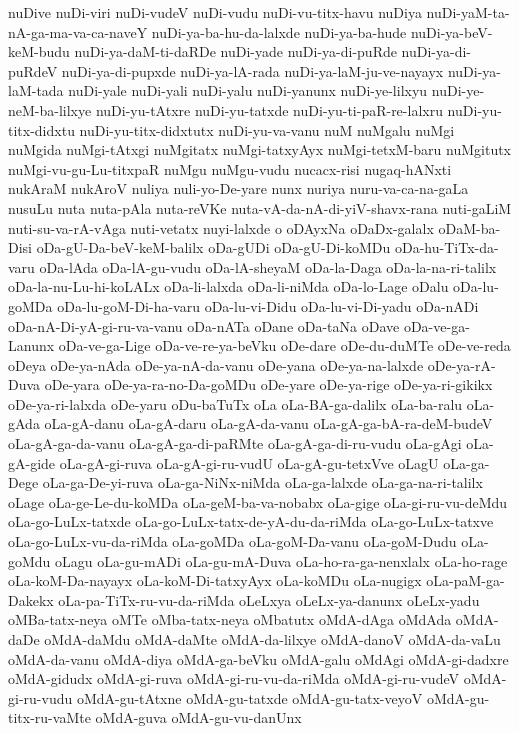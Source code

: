 {nuDive
nuDi-viri
nuDi-vudeV
nuDi-vudu
nuDi-vu-titx-havu
nuDiya
nuDi-yaM-ta-nA-ga-ma-va-ca-naveY
nuDi-ya-ba-hu-da-lalxde
nuDi-ya-ba-hude
nuDi-ya-beV-keM-budu
nuDi-ya-daM-ti-daRDe
nuDi-yade
nuDi-ya-di-puRde
nuDi-ya-di-puRdeV
nuDi-ya-di-pupxde
nuDi-ya-lA-rada
nuDi-ya-laM-ju-ve-nayayx
nuDi-ya-laM-tada
nuDi-yale
nuDi-yali
nuDi-yalu
nuDi-yanunx
nuDi-ye-lilxyu
nuDi-ye-neM-ba-lilxye
nuDi-yu-tAtxre
nuDi-yu-tatxde
nuDi-yu-ti-paR-re-lalxru
nuDi-yu-titx-didxtu
nuDi-yu-titx-didxtutx
nuDi-yu-va-vanu
nuM
nuMgalu
nuMgi
nuMgida
nuMgi-tAtxgi
nuMgitatx
nuMgi-tatxyAyx
nuMgi-tetxM-baru
nuMgitutx
nuMgi-vu-gu-Lu-titxpaR
nuMgu
nuMgu-vudu
nucacx-risi
nugaq-hANxti
nukAraM
nukAroV
nuliya
nuli-yo-De-yare
nunx
nuriya
nuru-va-ca-na-gaLa
nusuLu
nuta
nuta-pAla
nuta-reVKe
nuta-vA-da-nA-di-yiV-shavx-rana
nuti-gaLiM
nuti-su-va-rA-vAga
nuti-vetatx
nuyi-lalxde
o
oDAyxNa
oDaDx-galalx
oDaM-ba-Disi
oDa-gU-Da-beV-keM-balilx
oDa-gUDi
oDa-gU-Di-koMDu
oDa-hu-TiTx-da-varu
oDa-lAda
oDa-lA-gu-vudu
oDa-lA-sheyaM
oDa-la-Daga
oDa-la-na-ri-talilx
oDa-la-nu-Lu-hi-koLALx
oDa-li-lalxda
oDa-li-niMda
oDa-lo-Lage
oDalu
oDa-lu-goMDa
oDa-lu-goM-Di-ha-varu
oDa-lu-vi-Didu
oDa-lu-vi-Di-yadu
oDa-nADi
oDa-nA-Di-yA-gi-ru-va-vanu
oDa-nATa
oDane
oDa-taNa
oDave
oDa-ve-ga-Lanunx
oDa-ve-ga-Lige
oDa-ve-re-ya-beVku
oDe-dare
oDe-du-duMTe
oDe-ve-reda
oDeya
oDe-ya-nAda
oDe-ya-nA-da-vanu
oDe-yana
oDe-ya-na-lalxde
oDe-ya-rA-Duva
oDe-yara
oDe-ya-ra-no-Da-goMDu
oDe-yare
oDe-ya-rige
oDe-ya-ri-gikikx
oDe-ya-ri-lalxda
oDe-yaru
oDu-baTuTx
oLa
oLa-BA-ga-dalilx
oLa-ba-ralu
oLa-gAda
oLa-gA-danu
oLa-gA-daru
oLa-gA-da-vanu
oLa-gA-ga-bA-ra-deM-budeV
oLa-gA-ga-da-vanu
oLa-gA-ga-di-paRMte
oLa-gA-ga-di-ru-vudu
oLa-gAgi
oLa-gA-gide
oLa-gA-gi-ruva
oLa-gA-gi-ru-vudU
oLa-gA-gu-tetxVve
oLagU
oLa-ga-Dege
oLa-ga-De-yi-ruva
oLa-ga-NiNx-niMda
oLa-ga-lalxde
oLa-ga-na-ri-talilx
oLage
oLa-ge-Le-du-koMDa
oLa-geM-ba-va-nobabx
oLa-gige
oLa-gi-ru-vu-deMdu
oLa-go-LuLx-tatxde
oLa-go-LuLx-tatx-de-yA-du-da-riMda
oLa-go-LuLx-tatxve
oLa-go-LuLx-vu-da-riMda
oLa-goMDa
oLa-goM-Da-vanu
oLa-goM-Dudu
oLa-goMdu
oLagu
oLa-gu-mADi
oLa-gu-mA-Duva
oLa-ho-ra-ga-nenxlalx
oLa-ho-rage
oLa-koM-Da-nayayx
oLa-koM-Di-tatxyAyx
oLa-koMDu
oLa-nugigx
oLa-paM-ga-Dakekx
oLa-pa-TiTx-ru-vu-da-riMda
oLeLxya
oLeLx-ya-danunx
oLeLx-yadu
oMBa-tatx-neya
oMTe
oMba-tatx-neya
oMbatutx
oMdA-dAga
oMdAda
oMdA-daDe
oMdA-daMdu
oMdA-daMte
oMdA-da-lilxye
oMdA-danoV
oMdA-da-vaLu
oMdA-da-vanu
oMdA-diya
oMdA-ga-beVku
oMdA-galu
oMdAgi
oMdA-gi-dadxre
oMdA-gidudx
oMdA-gi-ruva
oMdA-gi-ru-vu-da-riMda
oMdA-gi-ru-vudeV
oMdA-gi-ru-vudu
oMdA-gu-tAtxne
oMdA-gu-tatxde
oMdA-gu-tatx-veyoV
oMdA-gu-titx-ru-vaMte
oMdA-guva
oMdA-gu-vu-danUnx
}
